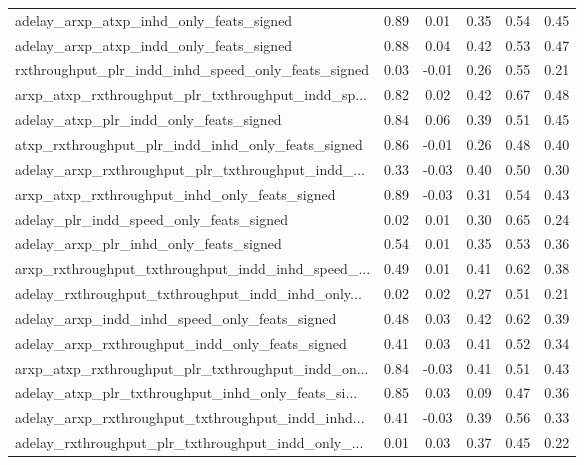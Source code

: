 \begin{tabular}{|l|*{4}{c}|r|}
adelay\_arxp\_atxp\_inhd\_only\_feats\_signed            & 0.89 &  0.01 &    0.35 &       0.54 &  0.45 \\
adelay\_arxp\_atxp\_indd\_only\_feats\_signed            & 0.88 &  0.04 &    0.42 &       0.53 &  0.47 \\
rxthroughput\_plr\_indd\_inhd\_speed\_only\_feats\_signed & 0.03 & -0.01 &    0.26 &       0.55 &  0.21 \\
arxp\_atxp\_rxthroughput\_plr\_txthroughput\_indd\_sp... & 0.82 &  0.02 &    0.42 &       0.67 &  0.48 \\
adelay\_atxp\_plr\_indd\_only\_feats\_signed             & 0.84 &  0.06 &    0.39 &       0.51 &  0.45 \\
atxp\_rxthroughput\_plr\_indd\_inhd\_only\_feats\_signed  & 0.86 & -0.01 &    0.26 &       0.48 &  0.40 \\
adelay\_arxp\_rxthroughput\_plr\_txthroughput\_indd\_... & 0.33 & -0.03 &    0.40 &       0.50 &  0.30 \\
arxp\_atxp\_rxthroughput\_inhd\_only\_feats\_signed      & 0.89 & -0.03 &    0.31 &       0.54 &  0.43 \\
adelay\_plr\_indd\_speed\_only\_feats\_signed            & 0.02 &  0.01 &    0.30 &       0.65 &  0.24 \\
adelay\_arxp\_plr\_inhd\_only\_feats\_signed             & 0.54 &  0.01 &    0.35 &       0.53 &  0.36 \\
arxp\_rxthroughput\_txthroughput\_indd\_inhd\_speed\_... & 0.49 &  0.01 &    0.41 &       0.62 &  0.38 \\
adelay\_rxthroughput\_txthroughput\_indd\_inhd\_only... & 0.02 &  0.02 &    0.27 &       0.51 &  0.21 \\
adelay\_arxp\_indd\_inhd\_speed\_only\_feats\_signed      & 0.48 &  0.03 &    0.42 &       0.62 &  0.39 \\
adelay\_arxp\_rxthroughput\_indd\_only\_feats\_signed    & 0.41 &  0.03 &    0.41 &       0.52 &  0.34 \\
arxp\_atxp\_rxthroughput\_plr\_txthroughput\_indd\_on... & 0.84 & -0.03 &    0.41 &       0.51 &  0.43 \\
adelay\_atxp\_plr\_txthroughput\_inhd\_only\_feats\_si... & 0.85 &  0.03 &    0.09 &       0.47 &  0.36 \\
adelay\_arxp\_rxthroughput\_txthroughput\_indd\_inhd... & 0.41 & -0.03 &    0.39 &       0.56 &  0.33 \\
adelay\_rxthroughput\_plr\_txthroughput\_indd\_only\_... & 0.01 &  0.03 &    0.37 &       0.45 &  0.22 \\

\end{tabular}
